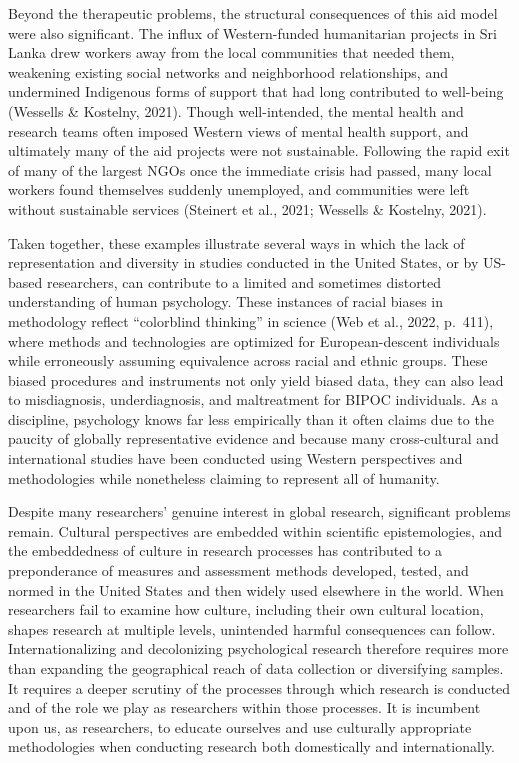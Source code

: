 \documentclass[
  11pt,
]{book}
\newcounter{none} %
\begin{document}
Beyond the therapeutic problems, the structural consequences of this aid model were also significant. The influx of Western-funded humanitarian projects in Sri Lanka drew workers away from the local communities that needed them, weakening existing social networks and neighborhood relationships, and undermined Indigenous forms of support that had long contributed to well-being (Wessells \& Kostelny, 2021). Though well-intended, the mental health and research teams often imposed Western views of mental health support, and ultimately many of the aid projects were not sustainable. Following the rapid exit of many of the largest NGOs once the immediate crisis had passed, many local workers found themselves suddenly unemployed, and communities were left without sustainable services (Steinert et al., 2021; Wessells \& Kostelny, 2021).

Taken together, these examples illustrate several ways in which the lack of representation and diversity in studies conducted in the United States, or by US-based researchers, can contribute to a limited and sometimes distorted understanding of human psychology. These instances of racial biases in methodology reflect ``colorblind thinking'' in science (Web et al., 2022, p.~411), where methods and technologies are optimized for European-descent individuals while erroneously assuming equivalence across racial and ethnic groups. These biased procedures and instruments not only yield biased data, they can also lead to misdiagnosis, underdiagnosis, and maltreatment for BIPOC individuals. As a discipline, psychology knows far less empirically than it often claims due to the paucity of globally representative evidence and because many cross-cultural and international studies have been conducted using Western perspectives and methodologies while nonetheless claiming to represent all of humanity.

Despite many researchers' genuine interest in global research, significant problems remain. Cultural perspectives are embedded within scientific epistemologies, and the embeddedness of culture in research processes has contributed to a preponderance of measures and assessment methods developed, tested, and normed in the United States and then widely used elsewhere in the world. When researchers fail to examine how culture, including their own cultural location, shapes research at multiple levels, unintended harmful consequences can follow. Internationalizing and decolonizing psychological research therefore requires more than expanding the geographical reach of data collection or diversifying samples. It requires a deeper scrutiny of the processes through which research is conducted and of the role we play as researchers within those processes. It is incumbent upon us, as researchers, to educate ourselves and use culturally appropriate methodologies when conducting research both domestically and internationally.
\end{document}
